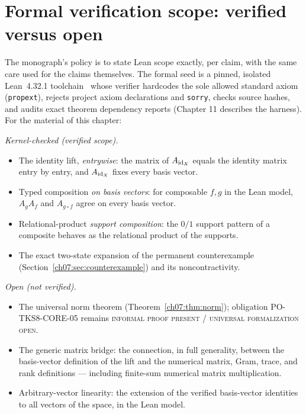 \section{Formal verification scope: verified versus open}\label{ch07:sec:lean}

The monograph's policy is to state Lean scope exactly, per claim, with the
same care used for the claims themselves. The formal seed is a pinned,
isolated Lean~4.32.1 toolchain~\cite{lean4} whose verifier hardcodes the
sole allowed standard axiom (\texttt{propext}), rejects project axiom
declarations and \texttt{sorry}, checks source hashes, and audits exact
theorem dependency reports (Chapter 11 describes the harness).
For the material of this chapter:

\emph{Kernel-checked (verified scope).}
\begin{itemize}
\item The identity lift, \emph{entrywise}: the matrix of $A_{\mathrm{id}_X}$ equals
  the identity matrix entry by entry, and $A_{\mathrm{id}_X}$ fixes every basis
  vector.
\item Typed composition \emph{on basis vectors}: for composable $f,g$ in the
  Lean model, $A_gA_f$ and $A_{g\circ f}$ agree on every basis vector.
\item Relational-product \emph{support composition}: the $0/1$ support
  pattern of a composite behaves as the relational product of the supports.
\item The exact two-state expansion of the permanent counterexample
  (Section~\ref{ch07:sec:counterexample}) and its noncontractivity.
\end{itemize}

\emph{Open (not verified).}
\begin{itemize}
\item The universal norm theorem (Theorem~\ref{ch07:thm:norm}); obligation
  PO-TKS8-CORE-05 remains \textsc{informal proof present / universal
  formalization open}.
\item The generic matrix bridge: the connection, in full generality, between
  the basis-vector definition of the lift and the numerical matrix, Gram,
  trace, and rank definitions --- including finite-sum numerical matrix
  multiplication.
\item Arbitrary-vector linearity: the extension of the verified basis-vector
  identities to all vectors of the space, in the Lean model.
\end{itemize}

